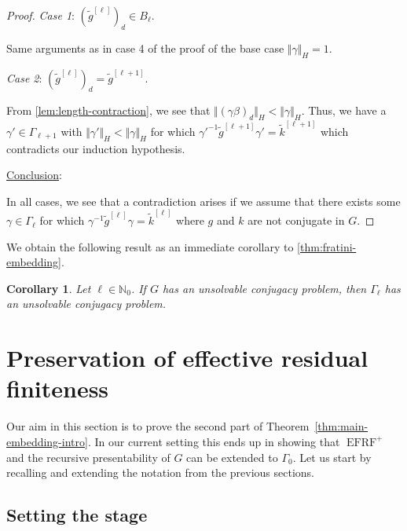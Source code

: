 \documentclass[a4paper]{amsart}
\numberwithin{equation}{section}
\newtheorem{corollary}[theorem]{Corollary}
\theoremstyle{definition}
\theoremstyle{remark}
\newcommand{\N}{\mathbb{N}}
\DeclareMathOperator{\EFRF}{EFRF}
\newcommand{\absH}[1]{\Vert #1 \Vert_H}
\newcommand{\bigAbsH}[1]{\bigl\Vert #1 \bigr\Vert_H}
\begin{document}
\begin{proof}
\medskip

\noindent\textit{Case 1}: $(\widetilde{g}^{[\ell]})_d\in B_\ell$.
\nopagebreak

\nopagebreak\smallskip
\nopagebreak\noindent
Same arguments as in case 4 of the proof of the base case $\absH{\gamma}=1$.

\medskip

\noindent\textit{Case 2}: $(\widetilde{g}^{[\ell]})_d = \widetilde{g}^{[\ell+1]}$.
\nopagebreak

\nopagebreak\smallskip
\nopagebreak\noindent
From \cref{lem:length-contraction}, we see that $\bigAbsH{(\gamma\beta)_d}< \absH{\gamma}$.
Thus, we have a $\gamma'\in \Gamma_{\ell+1}$ with $\absH{\gamma'}< \absH{\gamma}$ for which $\gamma'^{-1} \widetilde{g}^{[\ell+1]}\gamma' = \widetilde{k}^{[\ell+1]}$ which contradicts our induction hypothesis.

\medskip

\noindent\underline{Conclusion}:
\nopagebreak

\nopagebreak\smallskip
\nopagebreak\noindent
In all cases, we see that a contradiction arises if we assume that there exists some $\gamma\in \Gamma_{\ell}$ for which $\gamma^{-1} \widetilde{g}^{[\ell]}\gamma = \widetilde{k}^{[\ell]}$ where $g$ and $k$ are not conjugate in $G$.
\end{proof}

We obtain the following result as an immediate corollary to \cref{thm:fratini-embedding}.

\begin{corollary}\label{cor:conjugate-iff}
Let $\ell \in \N_0$.
If $G$ has an unsolvable conjugacy problem, then $\Gamma_\ell$ has an unsolvable conjugacy problem.
\end{corollary}

\section{Preservation of effective residual finiteness}\label{sec:eff-res-fin}

Our aim in this section is to prove the second part of Theorem~\ref{thm:main-embedding-intro}.
In our current setting this ends up in showing that $\EFRF^{+}$ and the recursive presentability of $G$ can be extended to $\Gamma_{0}$.
Let us start by recalling and extending the notation from the previous sections.

\subsection{Setting the stage}
\end{document}
